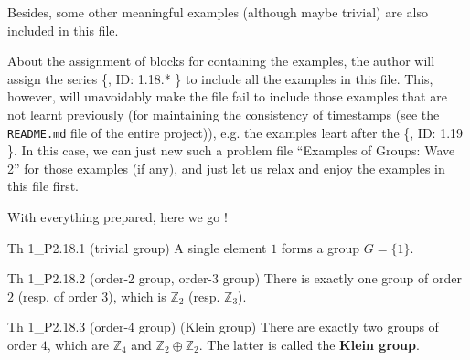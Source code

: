 \documentclass{article}
\begin{document}
Besides, some other meaningful examples (although maybe trivial) are also included in this file.

About the assignment of blocks for containing the examples, the author will assign the series \{, ID: 1.18.* \} to include all the examples in this file. This, however, will unavoidably make the file fail to include those examples that are not learnt previously (for maintaining the consistency of timestamps (see the \verb|README.md| file of the entire project)), e.g. the examples leart after the \{, ID: 1.19 \}. In this case, we can just new such a problem file ``Examples of Groups: Wave 2'' for those examples (if any), and just let us relax and enjoy the examples in this file first.

With everything prepared, here we go !

\begin{Th}{Th 1\_P2.18.1 (trivial group)}
    A single element $1$ forms a group $G = \{1\}$.
\end{Th}

\begin{Th}{Th 1\_P2.18.2 (order-2 group, order-3 group)}
    There is exactly one group of order $2$ (resp. of order $3$), which is $\mathbb{Z}_2$ (resp. $\mathbb{Z}_3$).
\end{Th}

\begin{Th}{Th 1\_P2.18.3 (order-4 group) (Klein group)}
    There are exactly two groups of order $4$, which are $\mathbb{Z}_4$ and $\mathbb{Z}_2 \oplus \mathbb{Z}_2$. \textcolor{Df}{The latter is called the \textbf{Klein group}.}
\end{Th}
\end{document}
